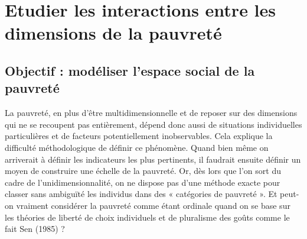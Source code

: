 \documentclass[12pt,a4paper]{reedthesis}
\begin{document}
\hypertarget{sec:objmem}{%
\section{Etudier les interactions entre les dimensions de la pauvreté}\label{sec:objmem}}

\hypertarget{objectif-moduxe9liser-lespace-social-de-la-pauvretuxe9}{%
\subsection{Objectif : modéliser l'espace social de la pauvreté}\label{objectif-moduxe9liser-lespace-social-de-la-pauvretuxe9}}

La pauvreté, en plus d'être multidimensionnelle et de reposer sur des dimensions qui ne se recoupent pas entièrement, dépend donc aussi de situations individuelles particulières et de facteurs potentiellement inobservables. Cela explique la difficulté méthodologique de définir ce phénomène. Quand bien même on arriverait à définir les indicateurs les plus pertinents, il faudrait ensuite définir un moyen de construire une échelle de la pauvreté. Or, dès lors que l'on sort du cadre de l'unidimensionnalité, on ne dispose pas d'une méthode exacte pour classer sans ambiguïté les individus dans des « catégories de pauvreté ». Et peut-on vraiment considérer la pauvreté comme étant ordinale quand on se base sur les théories de liberté de choix individuels et de pluralisme des goûts comme le fait Sen (1985) ?
\end{document}
